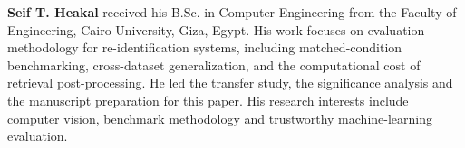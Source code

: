 \medskip\noindent\textbf{Seif T. Heakal} received his B.Sc. in Computer
Engineering from the Faculty of Engineering, Cairo University, Giza, Egypt. His
work focuses on evaluation methodology for re-identification systems, including
matched-condition benchmarking, cross-dataset generalization, and the
computational cost of retrieval post-processing. He led the transfer study, the
significance analysis and the manuscript preparation for this paper. His
research interests include computer vision, benchmark methodology and
trustworthy machine-learning evaluation.
